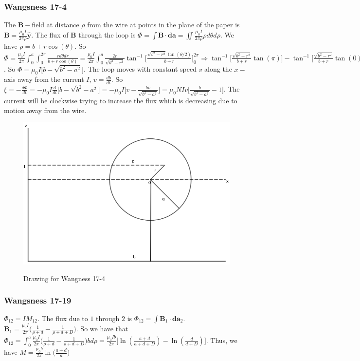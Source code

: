 \documentclass[oneside]{book}
\theoremstyle{mystyle}
\begin{document}
\subsubsection{Wangsness 17-4}
The $\mathbf{B}-$field at distance $\rho$ from the wire at points in the plane of the paper is $\mathbf{B} = \frac{\mu_0 I}{2\pi \rho} \hat{\mathbf{y}}$. The flux of $\mathbf{B}$ through the loop is $\Phi = \int \mathbf{B}\cdot \mathbf{da} = \iint \frac{\mu_0 I}{2\pi \rho}\rho d\theta d\rho$. We have $\rho = b+r\cos(\theta)$. So $\Phi = \frac{\mu_0 I}{2\pi} \int_{0}^{a} \int_{0}^{2\pi} \frac{r d\theta dr}{b+r\cos(\theta)} = \frac{\mu_0 I}{2\pi} \int_{0}^{a} \frac{2r}{\sqrt{b^2-r^2}}\tan^{-1}\big[\frac{\sqrt{b^2-r^2}\tan(\theta/2)}{b+r}\big]_{0}^{2\pi} \Rightarrow \tan^{-1}\big[\frac{\sqrt{b^2-r^2}}{b+r}\tan(\pi)\big] - \tan^{-1}\big[ \frac{\sqrt{b^2-r^2}}{b+r}\tan(0)\big]$. So $\Phi = \mu_0 I\big[b-\sqrt{b^2-a^2}\big]$. The loop moves with constant speed $v$ along the $x-$axis away from the current $I$, $v = \frac{db}{dt}$. So $\xi = -\frac{d\Phi}{dt} = -\mu_0 I \frac{d}{dt}\big[b-\sqrt{b^2-a^2}\big] = -\mu_0 I\big[ v-\frac{bv}{\sqrt{b^2-a^2}}\big] = \mu_0 NIv\big[ \frac{b}{\sqrt{b^2-a^2}}-1\big]$. The current will be clockwise trying to increase the flux which is decreasing due to motion away from the wire.
\begin{figure}[htbp]
    \centering
    {\includegraphics[scale=0.4]{17-4.png}}
    \caption{Drawing for Wangness 17-4}
\end{figure}
\subsubsection{Wangsness 17-19}
$\Phi_{12} = IM_{12}$. The flux due to $1$ through $2$ is $\Phi_{12} = \int \mathbf{B}_1 \cdot \mathbf{da}_2$. $\mathbf{B}_1 = \frac{\mu_0 I}{2\pi} \big( \frac{1}{\rho+d}- \frac{1}{\rho+d+D}\big)$. So we have that $\Phi_{12} = \int_{0}^{a} \frac{\mu_0 I}{2\pi} \big(\frac{1}{\rho+d}- \frac{1}{\rho+d+D}\big) bd\rho = \frac{\mu_0 Ib}{2\pi}\big[ \ln(\frac{a+d}{a+d+D}) - \ln(\frac{d}{d+D})\big]$. Thus, we have $M = \frac{\mu_0 b}{2\pi} \ln\big(\frac{a+d}{d}\big)$
\end{document}
